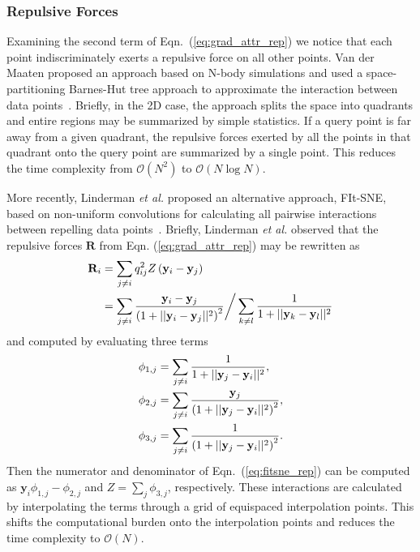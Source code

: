 \documentclass[twocolumn]{bmcart}
\begin{document}
\subsubsection*{Repulsive Forces}

Examining the second term of Eqn.~(\ref{eq:grad_attr_rep}) we notice that each
point indiscriminately exerts a repulsive force on all other points. Van der
Maaten proposed an approach based on N-body simulations and used a
space-partitioning Barnes-Hut tree approach to approximate the interaction
between data points~\cite{van2014accelerating}. Briefly, in the 2D case, the
approach splits the space into quadrants and entire regions may be summarized by
simple statistics.  If a query point is far away from a given quadrant, the
repulsive forces exerted by all the points in that quadrant onto the query point
are summarized by a single point. This reduces the time complexity from
$\mathcal{O}(N^2)$ to $\mathcal{O}(N \log N)$.

More recently, Linderman \textit{et al.} proposed an alternative approach,
FIt-SNE, based on non-uniform convolutions for calculating all pairwise
interactions between repelling data points~\cite{linderman2019fast}. Briefly,
Linderman \textit{et al.} observed that the repulsive forces $\mathbf{R}$ from
Eqn. (\ref{eq:grad_attr_rep}) may be rewritten as \begin{align}
\mathbf{R}_i &= \sum_{j \neq i} q_{ij}^2 Z \left ( \mathbf{y}_i - \mathbf{y}_j \right ) \notag \\
&= \sum_{j \neq i} \frac{\mathbf{y}_i - \mathbf{y}_j}{\left ( 1 + || \mathbf{y}_i - \mathbf{y}_j ||^2 \right )^{2}}
\bigg/
\sum_{k \neq l} \frac{1}{1 + || \mathbf{y}_k - \mathbf{y}_l || ^2} \label{eq:fitsne_rep}
\end{align} 
and computed by evaluating three terms
\begin{align}
\phi_{1, j} &= \sum_{j \neq i} \frac{1}{1 + || \mathbf{y}_j - \mathbf{y}_i ||^2}, \notag \\
\phi_{2, j} &= \sum_{j \neq i} \frac{\mathbf{y}_j}{\left( 1 + || \mathbf{y}_j - \mathbf{y}_i ||^2 \right)^2}, \notag \\
\phi_{3, j} &= \sum_{j \neq i} \frac{1}{\left( 1 + || \mathbf{y}_j - \mathbf{y}_i ||^2 \right)^2}. \label{eq:fitsne_terms}
\end{align}
Then the numerator and denominator of Eqn.~(\ref{eq:fitsne_rep}) can be
computed as $\mathbf{y}_i \phi_{1,j} - \phi_{2,j}$ and $Z = \sum_j \phi_{3,j}$,
respectively. These interactions are calculated by interpolating the terms
through a grid of equispaced interpolation points. This shifts the
computational burden onto the interpolation points and reduces the time
complexity to $\mathcal{O}(N)$.
\end{document}
